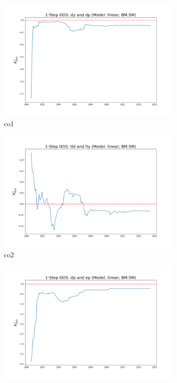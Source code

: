 \documentclass[a4paper,12pt,times,numbered,print,index]{report}
\numberwithin{equation}{section}
\begin{document}
	\begin{figure}[!htbp]
		\centering
		\caption{OOS Results for Model with $g_8$}
		\begin{subfigure}[b]{0.42\linewidth}
			\includegraphics[width=0.9\linewidth]{OOS_plots/linear_co1_SM.png}
			\caption{co1}
		\end{subfigure}
		\begin{subfigure}[b]{0.42\linewidth}
			\includegraphics[width=0.9\linewidth]{OOS_plots/linear_co2_SM.png}
			\caption{co2}
		\end{subfigure}
		\begin{subfigure}[b]{0.42\linewidth}
			\includegraphics[width=0.9\linewidth]{OOS_plots/linear_co3_SM.png}

\end{subfigure}
\end{figure}
\end{document}
